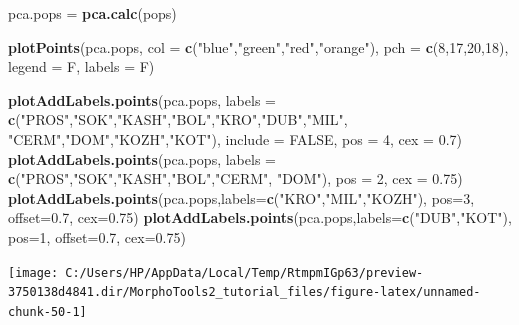 \documentclass[
]{article}
\newenvironment{Shaded}{\begin{snugshade}}{\end{snugshade}}
\newcommand{\DataTypeTok}[1]{\textcolor[rgb]{0.13,0.29,0.53}{#1}}
\newcommand{\DecValTok}[1]{\textcolor[rgb]{0.00,0.00,0.81}{#1}}
\newcommand{\FloatTok}[1]{\textcolor[rgb]{0.00,0.00,0.81}{#1}}
\newcommand{\KeywordTok}[1]{\textcolor[rgb]{0.13,0.29,0.53}{\textbf{#1}}}
\newcommand{\NormalTok}[1]{#1}
\newcommand{\OtherTok}[1]{\textcolor[rgb]{0.56,0.35,0.01}{#1}}
\newcommand{\StringTok}[1]{\textcolor[rgb]{0.31,0.60,0.02}{#1}}
\begin{document}
\begin{Shaded}
\begin{Highlighting}[]
\NormalTok{pca.pops =}\StringTok{ }\KeywordTok{pca.calc}\NormalTok{(pops)}

\KeywordTok{plotPoints}\NormalTok{(pca.pops, }\DataTypeTok{col =} \KeywordTok{c}\NormalTok{(}\StringTok{"blue"}\NormalTok{,}\StringTok{"green"}\NormalTok{,}\StringTok{"red"}\NormalTok{,}\StringTok{"orange"}\NormalTok{), }\DataTypeTok{pch =} \KeywordTok{c}\NormalTok{(}\DecValTok{8}\NormalTok{,}\DecValTok{17}\NormalTok{,}\DecValTok{20}\NormalTok{,}\DecValTok{18}\NormalTok{), }
            \DataTypeTok{legend =}\NormalTok{ F, }\DataTypeTok{labels =}\NormalTok{ F)}

\KeywordTok{plotAddLabels.points}\NormalTok{(pca.pops, }\DataTypeTok{labels =} \KeywordTok{c}\NormalTok{(}\StringTok{"PROS"}\NormalTok{,}\StringTok{"SOK"}\NormalTok{,}\StringTok{"KASH"}\NormalTok{,}\StringTok{"BOL"}\NormalTok{,}\StringTok{"KRO"}\NormalTok{,}\StringTok{"DUB"}\NormalTok{,}\StringTok{"MIL"}\NormalTok{,}
                      \StringTok{"CERM"}\NormalTok{,}\StringTok{"DOM"}\NormalTok{,}\StringTok{"KOZH"}\NormalTok{,}\StringTok{"KOT"}\NormalTok{), }\DataTypeTok{include =} \OtherTok{FALSE}\NormalTok{, }\DataTypeTok{pos =} \DecValTok{4}\NormalTok{, }\DataTypeTok{cex =} \FloatTok{0.7}\NormalTok{)}
\KeywordTok{plotAddLabels.points}\NormalTok{(pca.pops, }\DataTypeTok{labels =} \KeywordTok{c}\NormalTok{(}\StringTok{"PROS"}\NormalTok{,}\StringTok{"SOK"}\NormalTok{,}\StringTok{"KASH"}\NormalTok{,}\StringTok{"BOL"}\NormalTok{,}\StringTok{"CERM"}\NormalTok{, }\StringTok{"DOM"}\NormalTok{), }
                      \DataTypeTok{pos =} \DecValTok{2}\NormalTok{, }\DataTypeTok{cex =} \FloatTok{0.75}\NormalTok{)}
\KeywordTok{plotAddLabels.points}\NormalTok{(pca.pops,}\DataTypeTok{labels=}\KeywordTok{c}\NormalTok{(}\StringTok{"KRO"}\NormalTok{,}\StringTok{"MIL"}\NormalTok{,}\StringTok{"KOZH"}\NormalTok{), }\DataTypeTok{pos=}\DecValTok{3}\NormalTok{, }\DataTypeTok{offset=}\FloatTok{0.7}\NormalTok{, }\DataTypeTok{cex=}\FloatTok{0.75}\NormalTok{)}
\KeywordTok{plotAddLabels.points}\NormalTok{(pca.pops,}\DataTypeTok{labels=}\KeywordTok{c}\NormalTok{(}\StringTok{"DUB"}\NormalTok{,}\StringTok{"KOT"}\NormalTok{), }\DataTypeTok{pos=}\DecValTok{1}\NormalTok{, }\DataTypeTok{offset=}\FloatTok{0.7}\NormalTok{, }\DataTypeTok{cex=}\FloatTok{0.75}\NormalTok{)}
\end{Highlighting}
\end{Shaded}

\begin{center}\texttt{[image: C:/Users/HP/AppData/Local/Temp/RtmpmIGp63/preview-3750138d4841.dir/MorphoTools2\_tutorial\_files/figure-latex/unnamed-chunk-50-1]} \end{center}
\end{document}
